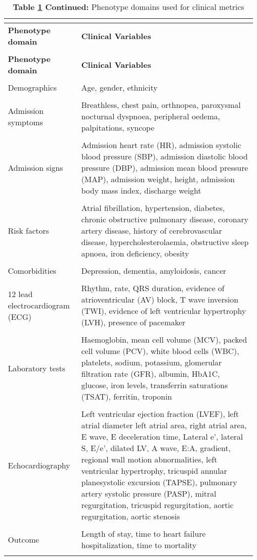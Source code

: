 \documentclass[../../doc/thesis/thesis.tex]{subfiles}
\begin{document}
\begin{longtable}{p{}  p{}}
    \caption{Phenotype domains used for clinical metrics}\vspace*{-0,1cm} \label{tab:var}\\
    \toprule
    \textbf{Phenotype domain} & \textbf{Clinical Variables}\\
    \midrule
\endfirsthead
    \caption*{\textbf{Table \ref{tab:var} Continued:} Phenotype domains used for clinical metrics}\vspace*{-0,1cm}\\
    \toprule
    \textbf{Phenotype domain} & \textbf{Clinical Variables}\\
    \midrule
\endhead
&\\
Demographics & Age, gender, ethnicity\\
&\\
Admission symptoms & Breathless, chest pain, orthnopea, paroxysmal nocturnal dyspnoea, peripheral oedema, palpitations, syncope\\
&\\
Admission signs & Admission heart rate (HR), admission systolic blood pressure (SBP), admission diastolic blood pressure (DBP), admission mean blood pressure (MAP), admission weight, height, admission body mass index, discharge weight\\
&\\
Risk factors & Atrial fibrillation, hypertension, diabetes, chronic obstructive pulmonary disease, coronary artery disease, history of cerebrovascular disease, hypercholesterolaemia, obstructive sleep apnoea, iron deficiency, obesity\\
&\\
Comorbidities & Depression, dementia, amyloidosis, cancer\\
&\\
12 lead electrocardiogram (ECG) & Rhythm, rate, QRS duration, evidence of atrioventricular (AV) block, T wave inversion (TWI), evidence of left ventricular hypertrophy (LVH), presence of pacemaker\\
&\\
Laboratory tests & Haemoglobin, mean cell volume (MCV), packed cell volume (PCV), white blood cells (WBC), platelets, sodium, potassium, glomerular filtration rate (GFR), albumin, HbA1C, glucose, iron levels, transferrin saturations (TSAT), ferritin, troponin\\
&\\
Echocardiography & Left ventricular ejection fraction (LVEF), left atrial diameter left atrial area, right atrial area, E wave, E deceleration time, Lateral e’, lateral S, E/e’, dilated LV, A wave, E:A, gradient, regional wall motion abnormalities, left ventricular hypertrophy, tricuspid annular planesystolic excursion (TAPSE), pulmonary artery systolic pressure (PASP), mitral regurgitation, tricuspid regurgitation, aortic regurgitation, aortic stenosis\\
&\\
Outcome & Length of stay, time to heart failure hospitalization, time to mortality\\
&\\
\midrule
\end{longtable}
\end{document}

